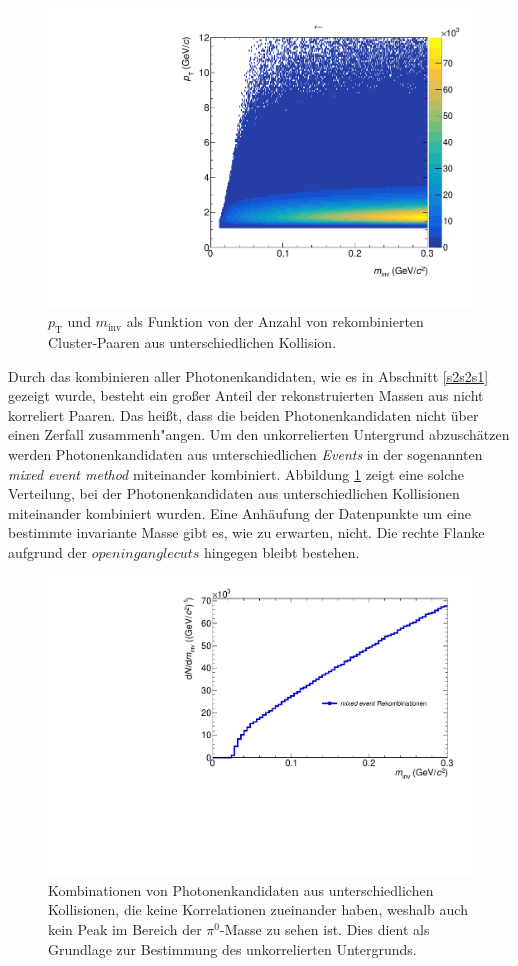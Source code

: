 \begin{figure}[thp]
\centering
\includegraphics[width=.7\linewidth]{hInvMass_pT_Bkg.pdf}
\caption{$p_\text{T}$ und $m_\text{inv}$ als Funktion von der Anzahl von rekombinierten  Cluster-Paaren aus unterschiedlichen Kollision.}
\label{figInvMassPt_b}
\end{figure}
Durch das kombinieren aller Photonenkandidaten, wie es in Abschnitt \ref{s2s2s1} gezeigt wurde, besteht ein gro{\ss}er Anteil der rekonstruierten Massen aus nicht korreliert Paaren.
Das hei{\ss}t, dass die beiden Photonenkandidaten nicht \"uber einen Zerfall zusammenh{"a}ngen.
Um den unkorrelierten Untergrund abzusch\"atzen werden Photonenkandidaten aus unterschiedlichen \textit{Events} in der sogenannten \textit{mixed event method} miteinander kombiniert.
Abbildung \ref{figInvMassPt_b} zeigt eine solche Verteilung, bei der Photonenkandidaten aus unterschiedlichen Kollisionen miteinander kombiniert wurden.
Eine Anh\"aufung der Datenpunkte um eine bestimmte invariante Masse gibt es, wie zu erwarten, nicht.
Die rechte Flanke aufgrund der $opening angle cuts$ hingegen bleibt bestehen.
\begin{figure}[thp]
\centering
\includegraphics[width=.75\linewidth]{hUncorrBkg.pdf}
\caption{Kombinationen von Photonenkandidaten aus unterschiedlichen Kollisionen, die keine Korrelationen zueinander haben, weshalb auch kein Peak im Bereich der $\pi^{0}$-Masse zu sehen ist. Dies dient als Grundlage zur Bestimmung des unkorrelierten Untergrunds.}
\label{figUncorrBkg}
\end{figure}
